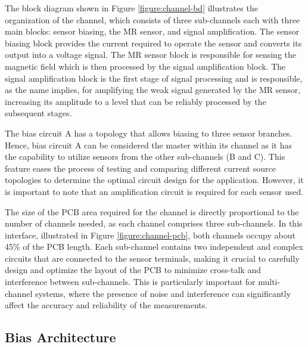 The block diagram shown in Figure \ref{figure:channel-bd} illustrates the organization of the channel, which consists of three sub-channels each with three main blocks: sensor biasing, the \ac{MR} sensor, and signal amplification. The sensor biasing block provides the current required to operate the sensor and converts its output into a voltage signal. The \ac{MR} sensor block is responsible for sensing the magnetic field which is then processed by the signal amplification block. The signal amplification block is the first stage of signal processing and is responsible, as the name implies, for amplifying the weak signal generated by the \ac{MR} sensor, increasing its amplitude to a level that can be reliably processed by the subsequent stages.

The bias circuit A has a topology that allows biasing to three sensor branches. Hence, bias circuit A can be considered the master within its channel as it has the capability to utilize sensors from the other sub-channels (B and C). This feature eases the process of testing and comparing different current source topologies to determine the optimal circuit design for the application. However, it is important to note that an amplification circuit is required for each sensor used.

The size of the \ac{PCB} area required for the channel is directly proportional to the number of channels needed, as each channel comprises three sub-channels. In this interface, illustrated in Figure \ref{figure:channel-pcb}, both channels occupy about 45\% of the \ac{PCB} length. Each sub-channel contains two independent and complex circuits that are connected to the sensor terminals, making it crucial to carefully design and optimize the layout of the \ac{PCB} to minimize cross-talk and interference between sub-channels. This is particularly important for multi-channel systems, where the presence of noise and interference can significantly affect the accuracy and reliability of the measurements.

\subsection{Bias Architecture}

